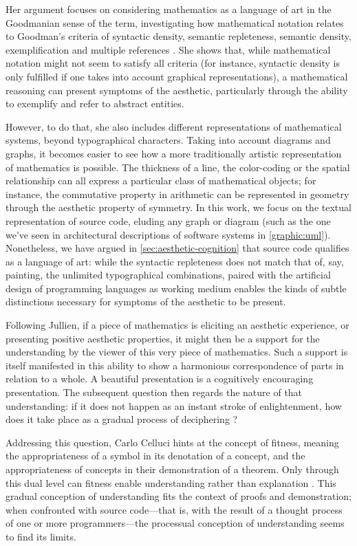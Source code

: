 Her argument focuses on considering mathematics as a language of art in the Goodmanian sense of the term, investigating how mathematical notation relates to Goodman's criteria of syntactic density, semantic repleteness, semantic density, exemplification and multiple references \citep{jullien_languages_2012}. She shows that, while mathematical notation might not seem to satisfy all criteria (for instance, syntactic density is only fulfilled if one takes into account graphical representations), a mathematical reasoning can present symptoms of the aesthetic, particularly through the ability to exemplify and refer to abstract entities.

However, to do that, she also includes different representations of mathematical systems, beyond typographical characters. Taking into account diagrams and graphs, it becomes easier to see how a more traditionally artistic representation of mathematics is possible. The thickness of a line, the color-coding or the spatial relationship can all express a particular class of mathematical objects; for instance, the commutative property in arithmetic can be represented in geometry through the aesthetic property of symmetry. In this work, we focus on the textual representation of source code, eluding any graph or diagram (such as the one we've seen in architectural descriptions of software systems in \autoref{graphic:uml}). Nonetheless, we have argued in \autoref{sec:aesthetic-cognition} that source code qualifies as a language of art: while the syntactic repleteness does not match that of, say, painting, the unlimited typographical combinations, paired with the artificial design of programming languages as working medium enables the kinds of subtle distinctions necessary for symptoms of the aesthetic to be present.

Following Jullien, if a piece of mathematics is eliciting an aesthetic experience, or presenting positive aesthetic properties, it might then be a support for the understanding by the viewer of this very piece of mathematics. Such a support is itself manifested in this ability to show a harmonious correspondence of parts in relation to a whole. A beautiful presentation is a cognitively encouraging presentation. The subsequent question then regards the nature of that understanding: if it does not happen as an instant stroke of enlightenment, how does it take place as a gradual process of deciphering \citep{rota_phenomenology_1997}?

Addressing this question, Carlo Celluci hints at the concept of fitness, meaning the appropriateness of a symbol in its denotation of a concept, and the appropriateness of concepts in their demonstration of a theorem. Only through this dual level can fitness enable understanding rather than explanation \citep{cellucci_mathematical_2015}. This gradual conception of understanding fits the context of proofs and demonstration; when confronted with source code—that is, with the result of a thought process of one or more programmers—the processual conception of understanding seems to find its limits.

